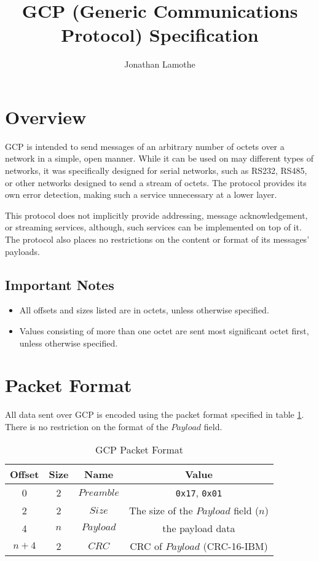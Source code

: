 \documentclass{article}
\title{GCP (Generic Communications Protocol) Specification}
\author{Jonathan Lamothe}
\begin{document}
\maketitle

\section{Overview}
GCP is intended to send messages of an arbitrary number of octets over
a network in a simple, open manner.  While it can be used on may
different types of networks, it was specifically designed for serial
networks, such as RS232, RS485, or other networks designed to send a
stream of octets.  The protocol provides its own error detection,
making such a service unnecessary at a lower layer.

This protocol does not implicitly provide addressing, message
acknowledgement, or streaming services, although, such services can be
implemented on top of it.  The protocol also places no restrictions on
the content or format of its messages' payloads.

\subsection{Important Notes}
\begin{itemize}
\item All offsets and sizes listed are in octets, unless otherwise
  specified.
\item Values consisting of more than one octet are sent most
  significant octet first, unless otherwise specified.
\end{itemize}

\section{Packet Format}
All data sent over GCP is encoded using the packet format specified in
table \ref{tab:gen-pkt-fmt}.  There is no restriction on the format of
the $Payload$ field.

\begin{table}[hbp]
  \center
  \begin{tabular}{cccc}
    \textbf{Offset} & \textbf{Size} & \textbf{Name} & \textbf{Value}\\
    \hline
    0 & 2 & $Preamble$ & \texttt{0x17}, \texttt{0x01}\\
    2 & 2 & $Size$ & The size of the $Payload$ field ($n$)\\
    4 & $n$ & $Payload$ & the payload data\\
    $n + 4$ & 2 & $CRC$ & CRC of $Payload$ (CRC-16-IBM)\\
    \hline
  \end{tabular}
  \caption{GCP Packet Format\label{tab:gen-pkt-fmt}}
\end{table}
\end{document}
